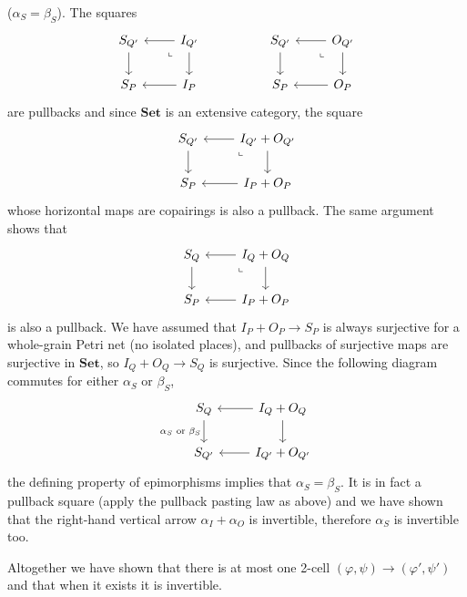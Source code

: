 \documentclass[11pt,a4paper]{article}
\theoremstyle{plain}
\theoremstyle{definition}
\theoremstyle{remark}
\begin{document}
($\alpha_S = \beta_S$). The squares
\[\begin{tikzcd}
	{S_{Q'}} & {I_{Q'}} && {S_{Q'}} & {O_{Q'}} \\
	{S_P} & {I_P} && {S_P} & {O_P}
	\arrow[from=1-1, to=2-1]
	\arrow[from=1-2, to=1-1]
	\arrow["\lrcorner"{anchor=center, pos=0.125, rotate=-90}, draw=none, from=1-2, to=2-1]
	\arrow[from=1-2, to=2-2]
	\arrow[from=1-4, to=2-4]
	\arrow[from=1-5, to=1-4]
	\arrow["\lrcorner"{anchor=center, pos=0.125, rotate=-90}, draw=none, from=1-5, to=2-4]
	\arrow[from=1-5, to=2-5]
	\arrow[from=2-2, to=2-1]
	\arrow[from=2-5, to=2-4]
\end{tikzcd}\]
are pullbacks and since $\mathbf{Set}$ is an extensive category, the square
\[\begin{tikzcd}
	{S_{Q'}} & {I_{Q'} + O_{Q'}} \\
	{S_P} & {I_P + O_P}
	\arrow[from=1-1, to=2-1]
	\arrow[from=1-2, to=1-1]
	\arrow["\lrcorner"{anchor=center, pos=0.125, rotate=-90}, draw=none, from=1-2, to=2-1]
	\arrow[from=1-2, to=2-2]
	\arrow[from=2-2, to=2-1]
\end{tikzcd}\]
whose horizontal maps are copairings is also a pullback. The same argument shows that
\[\begin{tikzcd}
	{S_Q} & {I_Q + O_Q} \\
	{S_P} & {I_P + O_P}
	\arrow[from=1-1, to=2-1]
	\arrow[from=1-2, to=1-1]
	\arrow["\lrcorner"{anchor=center, pos=0.125, rotate=-90}, draw=none, from=1-2, to=2-1]
	\arrow[from=1-2, to=2-2]
	\arrow[from=2-2, to=2-1]
\end{tikzcd}\]
is also a pullback. We have assumed that $I_P + O_P \to S_P$ is always surjective for a whole-grain Petri net (no isolated places), and pullbacks of surjective maps are surjective in $\mathbf{Set}$, so $I_Q + O_Q \to S_Q$ is surjective. Since the following diagram commutes for either $\alpha_S$ or $\beta_S$, 
\[\begin{tikzcd}
	{S_Q} & {I_Q + O_Q} \\
	{S_{Q'}} & {I_{Q'} + O_{Q'}}
    \arrow["\alpha_S \text{ or } \beta_S"', from=1-1, to=2-1]
	\arrow[from=1-2, to=1-1]
	\arrow[from=1-2, to=2-2]
	\arrow[from=2-2, to=2-1]
\end{tikzcd}\]
the defining property of epimorphisms implies that $\alpha_S = \beta_S$. It is in fact a pullback square (apply the pullback pasting law as above) and we have shown that the right-hand vertical arrow $\alpha_I + \alpha_O$ is invertible, therefore $\alpha_S$ is invertible too. 

Altogether we have shown that there is at most one 2-cell $(\varphi, \psi) \to (\varphi', \psi')$ and that when it exists it is invertible.
\end{document}
